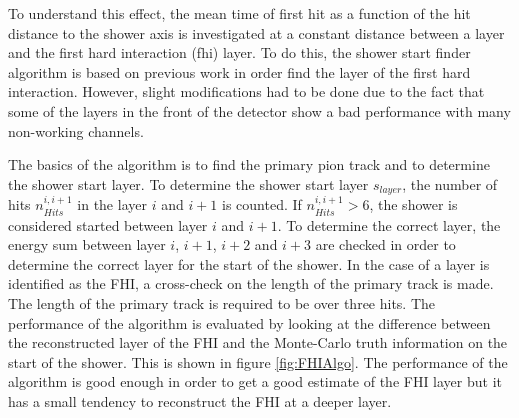 To understand this effect, the mean time of first hit as a function of the hit distance to the shower axis is investigated at a constant distance between a layer and the first hard interaction (\acrshort{fhi}) layer. To do this, the shower start finder algorithm is based on previous work \cite{CaN026} in order find the layer of the first hard interaction. However, slight modifications had to be done due to the fact that some of the layers in the front of the detector show a bad performance with many non-working channels.

The basics of the algorithm is to find the primary pion track and to determine the shower start layer. To determine the shower start layer $s_{layer}$, the number of hits $n_{Hits}^{i, i+1}$ in the layer $i$ and $i+1$ is counted. If $n_{Hits}^{i, i+1} > 6$, the shower is considered started between layer $i$ and $i+1$. To determine the correct layer, the energy sum between layer $i$, $i+1$, $i+2$ and $i+3$ are checked in order to determine the correct layer for the start of the shower. In the case of a layer is identified as the FHI, a cross-check on the length of the primary track is made. The length of the primary track is required to be over three hits. The performance of the algorithm is evaluated by looking at the difference between the reconstructed layer of the FHI and the Monte-Carlo truth information on the start of the shower. This is shown in figure \ref{fig:FHIAlgo}. The performance of the algorithm is good enough in order to get a good estimate of the FHI layer but it has a small tendency to reconstruct the FHI at a deeper layer.

